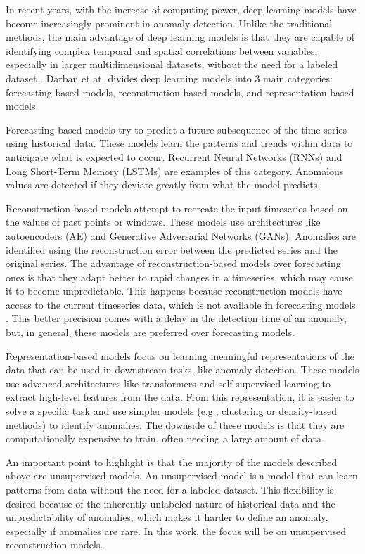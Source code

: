 In recent years, with the increase of computing power, deep learning models have become increasingly prominent in anomaly detection. Unlike the traditional methods, the main advantage of deep learning models is that they are capable of identifying complex temporal and spatial correlations between variables, especially in larger multidimensional datasets, without the need for a labeled dataset \cite{Choi_Yi_Park_Yoon_2021}. Darban et at. \cite{Zamanzadeh_Darban_Webb_Pan_Aggarwal_Salehi_2024} divides deep learning models into 3 main categories: forecasting-based models, reconstruction-based models, and representation-based models.

Forecasting-based models try to predict a future subsequence of the time series using historical data. These models learn the patterns and trends within data to anticipate what is expected to occur. Recurrent Neural Networks (RNNs) and Long Short-Term Memory (LSTMs) are examples of this category. Anomalous values are detected if they deviate greatly from what the model predicts.

Reconstruction-based models attempt to recreate the input timeseries based on the values of past points or windows. These models use architectures like autoencoders (AE) and Generative Adversarial Networks (GANs). Anomalies are identified using the reconstruction error between the predicted series and the original series. The advantage of reconstruction-based models over forecasting ones is that they adapt better to rapid changes in a timeseries, which may cause it to become unpredictable. This happens because reconstruction models have access to the current timeseries data, which is not available in forecasting models \cite{Zamanzadeh_Darban_Webb_Pan_Aggarwal_Salehi_2024}. This better precision comes with a delay in the detection time of an anomaly, but, in general, these models are preferred over forecasting models.

Representation-based models focus on learning meaningful representations of the data that can be used in downstream tasks, like anomaly detection.  These models use advanced architectures like transformers and self-supervised learning to extract high-level features from the data. From this representation, it is easier to solve a specific task and use simpler models (e.g., clustering or density-based methods) to identify anomalies. The downside of these models is that they are computationally expensive to train, often needing a large amount of data.

An important point to highlight is that the majority of the models described above are unsupervised models. An unsupervised model is a model that can learn patterns from data without the need for a labeled dataset. This flexibility is desired because of the inherently unlabeled nature of historical data and the unpredictability of anomalies, which makes it harder to define an anomaly, especially if anomalies are rare. In this work, the focus will be on unsupervised reconstruction models.

